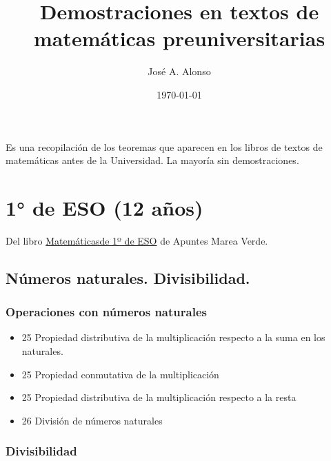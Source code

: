 \documentclass[a4paper,12pt,twoside]{book}
\author{José A. Alonso}
\date{\today}
\title{Demostraciones en textos de matemáticas preuniversitarias}
\theoremstyle{teorema}
\theoremstyle{remark}
\begin{document}
\maketitle
\tableofcontents

Es una recopilación de los teoremas que aparecen en los libros de textos
de matemáticas antes de la Universidad. La mayoría sin demostraciones.

\chapter{1° de ESO (12 años)}
\label{sec:org438308d}

Del libro \href{http://www.apuntesmareaverde.org.es/grupos/mat/LOMLOE/1ESO/1ESO.pdf}{Matemáticasde 1º de ESO} de Apuntes Marea Verde.

\section{Números naturales. Divisibilidad.}
\label{sec:orgfbfc8f8}

\subsection{Operaciones con números naturales}
\label{sec:org074f013}

\begin{itemize}
\item 25 Propiedad distributiva de la multiplicación respecto a la suma en los naturales.

\item 25 Propiedad conmutativa de la multiplicación

\item 25 Propiedad distributiva de la multiplicación respecto a la resta

\item 26 División de números naturales
\end{itemize}

\subsection{Divisibilidad}
\label{sec:org12a67bf}
\end{document}
